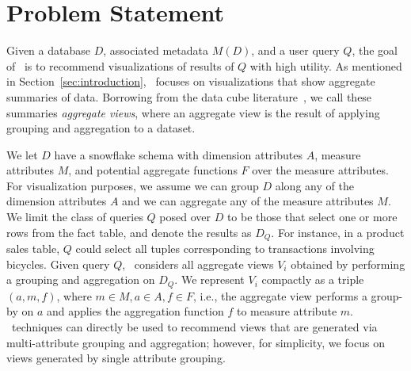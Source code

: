 

\section{Problem Statement}
\label{sec:problem_statement}

Given a database $D$, associated metadata $M(D)$, and a user query $Q$, the goal
of \SeeDB\ is to recommend visualizations of results of $Q$ with high utility. 
As mentioned in Section~\ref{sec:introduction}, \SeeDB\ focuses on visualizations 
that show aggregate summaries of data.
Borrowing from the data cube literature~\cite{olap}, 
we call these summaries {\it aggregate views}, where an aggregate view
is the result of applying grouping and aggregation to a dataset.

We let $D$ have a snowflake schema with 
dimension attributes $A$, measure attributes $M$, and potential
aggregate functions $F$ over the measure attributes. 
For visualization purposes, we assume we can group $D$ along any of the dimension attributes $A$ 
and we can aggregate any of the measure attributes $M$.
We limit the class of queries $Q$ posed over $D$ to be
those that select one or more rows from the fact table, 
and denote the results as $D_Q$. 
For instance, in a product sales table, $Q$ could select
all tuples corresponding to transactions involving bicycles.
Given query $Q$, \SeeDB\ considers all aggregate views 
$V_i$ obtained by performing a grouping and aggregation on $D_Q$. 
We represent $V_i$ compactly as a triple $(a, m, f)$, where $m \in M, a \in A, f \in F$, 
i.e., the aggregate view 
performs a group-by on $a$ and applies the aggregation function $f$ to measure
attribute $m$. 
\SeeDB\ techniques can directly be used to recommend views that are
generated via multi-attribute grouping and aggregation; however,
for simplicity, we focus on views generated by single attribute grouping. 



